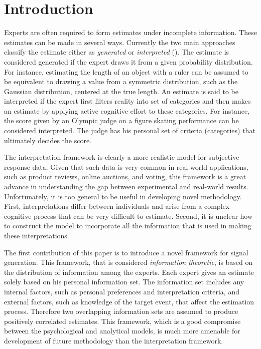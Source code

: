 \documentclass[11pt,twoside]{article}
\begin{document}
\section{Introduction}
Experts are often required to form estimates under incomplete information. These estimates can be made in several ways. Currently the two main approaches classify the estimate either as \textit{generated} or \textit{interpreted} (\cite{hong2009interpreted}). The estimate is considered generated if the expert draws it from a given probability distribution. For instance, estimating the length of an object with a ruler can be assumed to be equivalent to drawing a value from a symmetric distribution, such as the Gaussian distribution, centered at the true length. An estimate is said to be interpreted if the expert first filters reality into set of categories and then makes an estimate by applying active cognitive effort to these categories. For instance, the score given by an Olympic judge on a figure skating performance can be considered interpreted. The judge has his personal set of criteria (categories) that ultimately decides the score. 

The interpretation framework is clearly a more realistic model for subjective response data. Given that such data is very common in real-world applications, such as product reviews, online auctions, and voting, this framework is a great advance in understanding the gap between experimental and real-world results. Unfortunately, it is too general to be useful in developing novel methodology. First,  interpretations differ between individuals and arise from a complex cognitive process that can be very difficult to estimate. Second, it is unclear how to construct the model to incorporate all the information that is used in making these interpretations.


The first contribution of this paper is to introduce a novel framework for signal generation. This framework, that is considered \textit{information theoretic}, is based on the distribution of information among the experts. Each expert gives an estimate solely based on his personal information set. The information set includes any internal factors, such as personal preferences and interpretation criteria, and external factors, such as knowledge of the target event, that affect the estimation process. Therefore two overlapping information sets are assumed to produce positively correlated estimates. This framework, which is a good compromise between the psychological and analytical models, is much more amenable for development of future methodology than the interpretation framework. 
\end{document}
